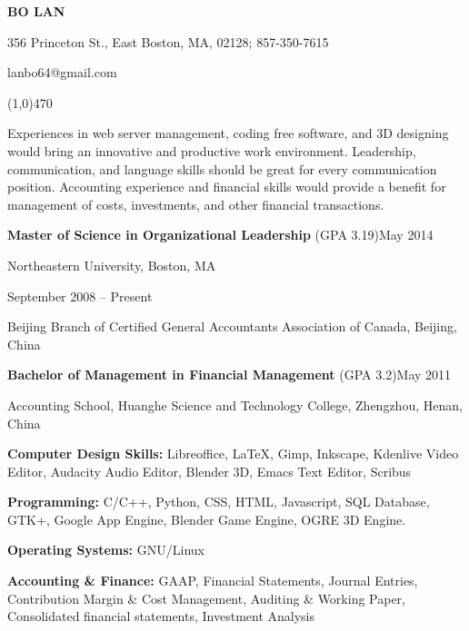 \documentclass[10pt]{article}
\begin{document}
\centerline{\large \bf BO LAN}

\centerline{356 Princeton St., East Boston, MA, 02128; 857-350-7615}

\centerline{lanbo64@gmail.com}

\noindent

\centerline{\line(1,0){470}}

\medskip


\noindent
Experiences in web server management, coding free software, and 3D designing would bring an innovative and productive work environment. Leadership, communication, and language skills should be great for every communication position. Accounting experience and financial skills would provide a benefit for management of costs, investments, and other financial transactions.

\medskip


\noindent
{\bf Master of Science in Organizational Leadership} (GPA 3.19)\hfill May 2014

\noindent
Northeastern University, Boston, MA

\smallskip

 \hfill  September 2008 -- Present

\noindent Beijing Branch of Certified General Accountants Association of Canada, Beijing, China

\smallskip

\noindent
{\bf Bachelor of Management in Financial Management} (GPA 3.2)\hfill May 2011

\noindent
Accounting School, Huanghe Science and Technology College, Zhengzhou, Henan, China

\medskip


\noindent
{\bf Computer Design Skills:} Libreoffice, {\LaTeX}, Gimp, Inkscape, Kdenlive Video Editor, Audacity Audio Editor, Blender 3D, Emacs Text Editor, Scribus

\noindent
{\bf Programming:} C/C++, Python, CSS, HTML, Javascript, SQL Database, GTK+, Google App Engine, Blender Game Engine, OGRE 3D Engine.

\noindent
{\bf Operating Systems:} GNU/Linux

\noindent
{\bf Accounting \& Finance:} GAAP, Financial Statements, Journal Entries, Contribution Margin \& Cost Management, Auditing \& Working Paper, Consolidated financial statements, Investment Analysis
\end{document}
